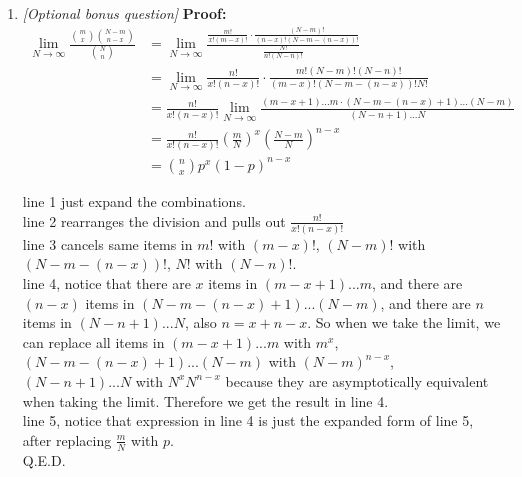 \documentclass[11pt]{article}
\begin{document}
\begin{enumerate}[label=\textbf{Question \arabic*:},start=1]
\begin{enumerate}
  \item {\em [Optional bonus question]} 
\textbf{Proof:}\\
\begin{equation}
\begin{split}
\lim_{N\rightarrow\infty} \frac { {m \choose x}{N-m \choose n-x}}{ {N\choose n}} & = \lim_{N\rightarrow\infty} \frac { \frac{m!}{x!(m-x)!} \cdot \frac{(N-m)!}{(n-x)!(N-m-(n-x))!}}{ \frac{N!}{n!(N-n)!} } \\
& = \lim_{N\rightarrow\infty} \frac{n!}{x!(n-x)!} \cdot \frac{m! (N-m)! (N-n)!}{(m-x)! (N-m - (n-x))! N!} \\
& = \frac{n!}{x!(n-x)!}  \lim_{N\rightarrow\infty} \frac{(m-x+1)...m \cdot (N-m-(n-x)+1)...(N-m)}{(N-n+1)...N} \\
& = \frac{n!}{x!(n-x)!}  (\frac{m}{N})^x (\frac{N-m}{N})^{n-x} \\
& = {n \choose x} p^x (1-p)^{n-x}
\end{split}
\end{equation}

line 1 just expand the combinations. \\
line 2 rearranges the division and pulls out  $\frac{n!}{x!(n-x)!}$ \\
line 3 cancels same items in $m!$ with $(m-x)!$,  $(N-m)!$ with $(N-m-(n-x))!$, $N!$ with $(N-n)!$. \\
line 4, notice that there are $x$ items in $(m-x+1)...m$, and there are $(n-x)$ items in $(N-m-(n-x)+1)...(N-m)$, and there are $n$ items in $(N-n+1)...N$, also $n = x + n-x$. So when we take the limit, we can replace all items in $(m-x+1)...m$ with $m^x$, $(N-m-(n-x)+1)...(N-m)$ with $(N-m)^{n-x}$, $(N-n+1)...N$ with $N^x N^{n-x}$ because they are asymptotically equivalent when taking the limit. Therefore we get the result in line 4. \\
line 5, notice that expression in line 4 is just the expanded form of line 5, after replacing $\frac{m}{N}$ with $p$.\\
Q.E.D.

\end{enumerate}




\vspace*{3mm}


\end{enumerate}
\end{document}
